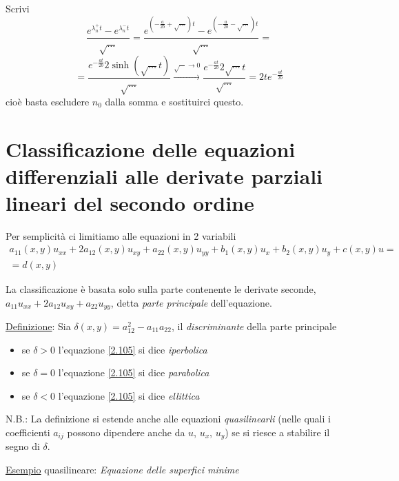 \documentclass[a4paper,11pt]{report}
\begin{document}
Scrivi
\[
\frac{e^{\lambda_n^+ t} - e^{\lambda_n^- t}}{\sqrt{\dots}}= \frac{e^{\left(-\frac{a}{2b}+\sqrt{\dots}\right)t}- e^{\left(-\frac{a}{2b}-\sqrt{\dots}\right)t}}{\sqrt{\dots}}=
\]
\[
=\frac{e^{-\frac{at}{2b}} 2\sinh (\sqrt{\dots} t)}{\sqrt{\dots}} \xrightarrow{\sqrt{\cdots}\to 0} \frac{e^{-\frac{at}{2b}}2\sqrt{\cdots}t}{\sqrt{\cdots}}=2te^{-\frac{at}{2b}}
\]
cio\`e basta escludere $n_0$ dalla somma e sostituirci questo.

\section{Classificazione delle equazioni differenziali alle derivate parziali lineari del secondo ordine}

Per semplicit\`a ci limitiamo alle equazioni in 2 variabili
\begin{multline}
a_{11}(x,y)u_{xx} + 2a_{12}(x,y)u_{xy} + a_{22}(x,y)u_{yy} + b_{1}(x,y)u_{x} + b_2(x,y)u_y + c(x,y)u =\\= d(x,y)
\label{2.105}
\end{multline}

La classificazione \`e basata solo sulla parte contenente le derivate seconde, $a_{11}u_{xx} + 2a_{12}u_{xy} +a_{22}u_{yy}$, detta \emph{parte principale} dell'equazione.

\smallskip

\underline{Definizione}: Sia $\delta(x,y)=a_{12}^2 - a_{11}a_{22}$, il \emph{discriminante} della parte principale
\begin{itemize}
\item se $\delta >0$ l'equazione \eqref{2.105} si dice \emph{iperbolica}
\item se $\delta =0$ l'equazione \eqref{2.105} si dice \emph{parabolica}
\item se $\delta <0$ l'equazione \eqref{2.105} si dice \emph{ellittica}
\end{itemize}
N.B.: La definizione si estende anche alle equazioni \emph{quasilinearli} (nelle quali i coefficienti $a_{ij}$ possono dipendere anche da $u$, $u_x$, $u_y$) se si riesce a stabilire il segno di $\delta$.

\medskip

\underline{Esempio} quasilineare: \emph{Equazione delle superfici minime}
\end{document}
